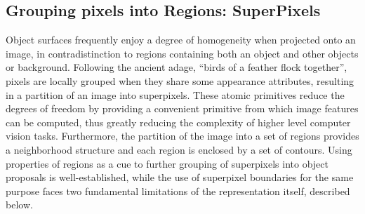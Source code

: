 

\subsection{Grouping pixels into Regions: SuperPixels}


Object surfaces frequently enjoy a degree of homogeneity when projected onto an image, in contradistinction to regions containing both an object and other objects or background. Following the ancient adage, ``birds of a feather flock together'', pixels are locally grouped when they share some appearance attributes, resulting in a partition of an image into superpixels. These atomic primitives reduce the degrees of freedom by providing a convenient primitive from which image features can be computed, thus greatly reducing the complexity of higher level computer vision tasks. Furthermore, the partition of the image into a set of regions provides a neighborhood structure and each region is enclosed by a set of contours. Using properties of regions as a cue to further grouping of superpixels into object proposals is well-established, while the use of superpixel boundaries for the same purpose faces two fundamental limitations of the representation itself, described below. 



